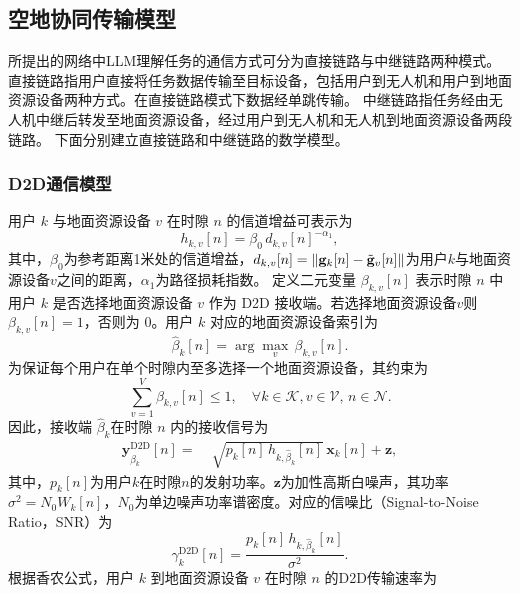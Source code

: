\subsection{空地协同传输模型}
所提出的网络中LLM理解任务的通信方式可分为直接链路与中继链路两种模式。
直接链路指用户直接将任务数据传输至目标设备，包括用户到无人机和用户到地面资源设备两种方式。在直接链路模式下数据经单跳传输。
中继链路指任务经由无人机中继后转发至地面资源设备，经过用户到无人机和无人机到地面资源设备两段链路。
下面分别建立直接链路和中继链路的数学模型。

\subsubsection{D2D通信模型}
用户 $k$ 与地面资源设备 $v$ 在时隙 $n$ 的信道增益可表示为
\begin{equation}
h_{k,v}[n]=\beta_{0}\,d_{k,v}[n]^{-\alpha_1},
\end{equation}
其中，$\beta_0$为参考距离1米处的信道增益，$d_{k,v}[n]=\|{\bf g}_k[n]-\tilde{\bf g}_v[n]\|$为用户$k$与地面资源设备$v$之间的距离，$\alpha_1$为路径损耗指数。
定义二元变量 $\beta_{k,v}[n]$ 表示时隙 $n$ 中用户 $k$ 是否选择地面资源设备 $v$ 作为 D2D 接收端。若选择地面资源设备$v$则 $\beta_{k,v}[n]=1$，否则为 $0$。用户 $k$ 对应的地面资源设备索引为
\begin{equation}
\hat{\beta }_k[n]=\arg\max_{v}\,\beta_{k,v}[n].
\end{equation}
为保证每个用户在单个时隙内至多选择一个地面资源设备，其约束为
\begin{equation}\label{C:betaleq1}
\sum_{v=1}^{V}\beta_{k,v}[n]\le 1,\quad \forall k\in\mathcal{K}, v\in\mathcal{V},\, n\in\mathcal{N}.
\end{equation}
因此，接收端 $\hat{\beta}_k$在时隙 $n$ 内的接收信号为
\begin{align}
\mathbf{y}_{{\hat \beta}_k}^{\text{D2D}}[n]=\;&\sqrt{p_k[n]\,h_{k,{\hat{\beta }_k}}[n]}\,{\mathbf{x}}_k[n]\nonumber+\mathbf{z},
\end{align}
其中，$p_k[n]$为用户$k$在时隙$n$的发射功率。$\mathbf{z}$为加性高斯白噪声，其功率$\sigma^2 = N_0 W_k[n]$，$N_0$为单边噪声功率谱密度。对应的信噪比（Signal-to-Noise Ratio，SNR）为
\begin{equation}
\gamma_k^{\text{D2D}}[n]=\frac{p_k[n]\,h_{k,{\hat{\beta}_k}}[n]}{\sigma^{2}}.
\end{equation}
根据香农公式，用户 $k$ 到地面资源设备 $v$ 在时隙 $n$ 的D2D传输速率为

